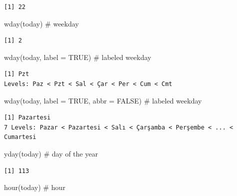 \documentclass[
  letterpaper,
  DIV=11,
  numbers=noendperiod]{scrreprt}
\newenvironment{Shaded}{\begin{snugshade}}{\end{snugshade}}
\newcommand{\AttributeTok}[1]{\textcolor[rgb]{0.40,0.45,0.13}{#1}}
\newcommand{\CommentTok}[1]{\textcolor[rgb]{0.37,0.37,0.37}{#1}}
\newcommand{\ConstantTok}[1]{\textcolor[rgb]{0.56,0.35,0.01}{#1}}
\newcommand{\FunctionTok}[1]{\textcolor[rgb]{0.28,0.35,0.67}{#1}}
\newcommand{\NormalTok}[1]{\textcolor[rgb]{0.00,0.23,0.31}{#1}}
\begin{document}
\begin{verbatim}
[1] 22
\end{verbatim}

\begin{Shaded}
\begin{Highlighting}[]
\FunctionTok{wday}\NormalTok{(today) }\CommentTok{\# weekday}
\end{Highlighting}
\end{Shaded}

\begin{verbatim}
[1] 2
\end{verbatim}

\begin{Shaded}
\begin{Highlighting}[]
\FunctionTok{wday}\NormalTok{(today, }\AttributeTok{label =} \ConstantTok{TRUE}\NormalTok{) }\CommentTok{\# labeled weekday}
\end{Highlighting}
\end{Shaded}

\begin{verbatim}
[1] Pzt
Levels: Paz < Pzt < Sal < Çar < Per < Cum < Cmt
\end{verbatim}

\begin{Shaded}
\begin{Highlighting}[]
\FunctionTok{wday}\NormalTok{(today, }\AttributeTok{label =} \ConstantTok{TRUE}\NormalTok{, }\AttributeTok{abbr =} \ConstantTok{FALSE}\NormalTok{) }\CommentTok{\# labeled weekday}
\end{Highlighting}
\end{Shaded}

\begin{verbatim}
[1] Pazartesi
7 Levels: Pazar < Pazartesi < Salı < Çarşamba < Perşembe < ... < Cumartesi
\end{verbatim}

\begin{Shaded}
\begin{Highlighting}[]
\FunctionTok{yday}\NormalTok{(today) }\CommentTok{\# day of the year}
\end{Highlighting}
\end{Shaded}

\begin{verbatim}
[1] 113
\end{verbatim}

\begin{Shaded}
\begin{Highlighting}[]
\FunctionTok{hour}\NormalTok{(today) }\CommentTok{\# hour}
\end{Highlighting}
\end{Shaded}
\end{document}
